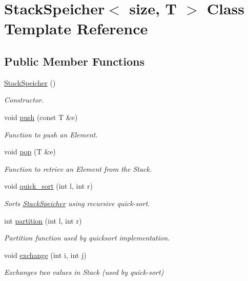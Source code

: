 \hypertarget{class_stack_speicher}{}\section{Stack\+Speicher$<$ size, T $>$ Class Template Reference}
\label{class_stack_speicher}
\subsection*{Public Member Functions}
\begin{DoxyCompactItemize}
\item 
\hypertarget{class_stack_speicher_af6924ed80e8519855a3307d4f887b92b}{}\hyperlink{class_stack_speicher_af6924ed80e8519855a3307d4f887b92b}{Stack\+Speicher} ()\label{class_stack_speicher_af6924ed80e8519855a3307d4f887b92b}

\begin{DoxyCompactList}\small\item\em Constructor. \end{DoxyCompactList}\item 
void \hyperlink{class_stack_speicher_ad4e07c4f0d95692aa757b87e42907622}{push} (const T \&e)
\begin{DoxyCompactList}\small\item\em Function to push an Element. \end{DoxyCompactList}\item 
void \hyperlink{class_stack_speicher_ad46546f6e554a33f72f37f99ae9bb1f7}{pop} (T \&e)
\begin{DoxyCompactList}\small\item\em Function to retriev an Element from the Stack. \end{DoxyCompactList}\item 
void \hyperlink{class_stack_speicher_a5fee58ad92ef29024d73bd9f2dcf33c0}{quick\+\_\+sort} (int l, int r)
\begin{DoxyCompactList}\small\item\em Sorts \hyperlink{class_stack_speicher}{Stack\+Speicher} using recursive quick-\/sort. \end{DoxyCompactList}\item 
int \hyperlink{class_stack_speicher_a82244bc656520b9b7062760711b09699}{partition} (int l, int r)
\begin{DoxyCompactList}\small\item\em Partition function used by quicksort implementation. \end{DoxyCompactList}\item 
void \hyperlink{class_stack_speicher_a065be1c2184e6db1c757d9be5e70c296}{exchange} (int i, int j)
\begin{DoxyCompactList}\small\item\em Exchanges two values in Stack (used by quick-\/sort) \end{DoxyCompactList}\end{DoxyCompactItemize}



